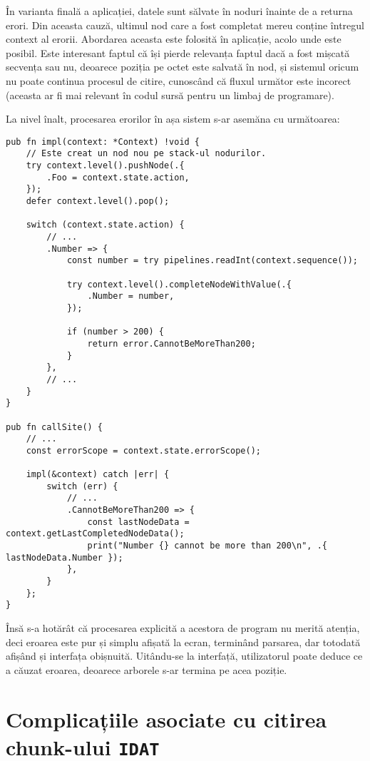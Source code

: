 \documentclass[a4paper,12pt]{report}
\begin{document}
În varianta finală a aplicației, datele sunt sălvate în noduri înainte de a returna erori.
Din aceasta cauză, ultimul nod care a fost completat mereu conține întregul context al erorii.
Abordarea aceasta este folosită în aplicație, acolo unde este posibil.
Este interesant faptul că își pierde relevanța faptul dacă a fost mișcată secvența sau nu,
deoarece poziția pe octet este salvată în nod, și sistemul oricum nu poate continua procesul de citire,
cunoscând că fluxul următor este incorect
(aceasta ar fi mai relevant în codul sursă pentru un limbaj de programare).

La nivel înalt, procesarea erorilor în așa sistem s-ar asemăna cu următoarea:

\begin{verbatim}
pub fn impl(context: *Context) !void {
    // Este creat un nod nou pe stack-ul nodurilor.
    try context.level().pushNode(.{
        .Foo = context.state.action,
    });
    defer context.level().pop();

    switch (context.state.action) {
        // ...
        .Number => {
            const number = try pipelines.readInt(context.sequence());

            try context.level().completeNodeWithValue(.{
                .Number = number,
            });

            if (number > 200) {
                return error.CannotBeMoreThan200;
            }
        },
        // ...
    }
}

pub fn callSite() {
    // ... 
    const errorScope = context.state.errorScope();

    impl(&context) catch |err| {
        switch (err) {
            // ...
            .CannotBeMoreThan200 => {
                const lastNodeData = context.getLastCompletedNodeData();
                print("Number {} cannot be more than 200\n", .{ lastNodeData.Number });
            },
        }
    };
}
\end{verbatim}

Însă s-a hotărât că procesarea explicită a acestora de program nu merită atenția,
deci eroarea este pur și simplu afișată la ecran, terminând parsarea,
dar totodată afișând și interfața obișnuită.
Uitându-se la interfață, utilizatorul poate deduce ce a căuzat eroarea,
deoarece arborele s-ar termina pe acea poziție.

\section{Complicațiile asociate cu citirea chunk-ului \texttt{IDAT}}
\end{document}
